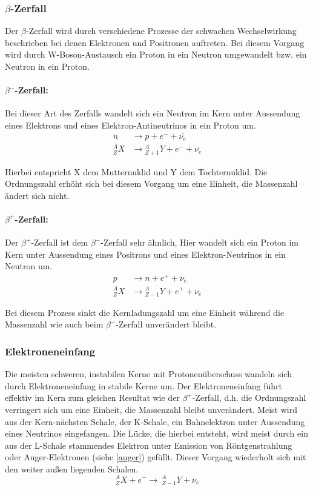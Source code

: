 \documentclass[12pt]{article}
\begin{document}
\subsubsection{$\beta$-Zerfall}
Der $\beta$-Zerfall wird durch verschiedene Prozesse der schwachen Wechselwirkung beschrieben bei denen Elektronen  und Positronen auftreten. Bei diesem Vorgang wird durch W-Boson-Austausch ein Proton in ein Neutron umgewandelt bzw. ein Neutron in ein Proton.

\paragraph*{$\beta^-$-Zerfall:} 
Bei dieser Art des Zerfalls wandelt sich ein Neutron im Kern unter Aussendung eines Elektrons und eines Elektron-Antineutrinos in ein Proton um. 
\begin{align*}
n &\rightarrow p + e^- + \bar{\nu_e}\\
{}_Z^A X &\rightarrow {}_{Z+1}^A Y + e^- + \bar{\nu_e}
\end{align*}

Hierbei entspricht X dem Mutternuklid und Y dem Tochternuklid. Die Ordnungszahl erhöht sich bei diesem Vorgang um eine Einheit, die Massenzahl ändert sich nicht.

\paragraph*{$\beta^+$-Zerfall:}
Der $\beta^+$-Zerfall ist dem $\beta^-$-Zerfall sehr ähnlich, Hier wandelt sich ein Proton im Kern unter Aussendung eines Positrons und eines Elektron-Neutrinos in ein Neutron um.
\begin{align*}
p &\rightarrow n + e^+ + \nu_e\\
{}_Z^A X &\rightarrow {}_{Z-1}^A Y + e^+ + \nu_e
\end{align*}

Bei diesem Prozess sinkt die Kernladungszahl um eine Einheit während die Massenzahl wie auch beim $\beta^-$-Zerfall unverändert bleibt.
\subsubsection{Elektroneneinfang}
Die meisten schweren, instabilen Kerne mit Protonenüberschuss wandeln sich durch Elektroneneinfang in stabile Kerne um.
Der Elektroneneinfang führt effektiv im Kern zum gleichen Resultat wie der $\beta^+$-Zerfall, d.h. die Ordnungszahl verringert sich um eine Einheit, die Massenzahl bleibt unverändert. Meist wird aus der Kern-nächsten Schale, der K-Schale, ein Bahnelektron unter Aussendung eines Neutrinos eingefangen. Die Lücke, die hierbei entsteht, wird meist durch ein aus der L-Schale stammendes Elektron unter Emission von Röntgenstrahlung oder Auger-Elektronen (siehe \ref{auger}) gefüllt. Dieser Vorgang wiederholt sich mit den weiter außen liegenden Schalen.
\[{}_Z^A X + e^- \rightarrow\ {}_{Z-1}^A Y + \nu_e\]
\end{document}
